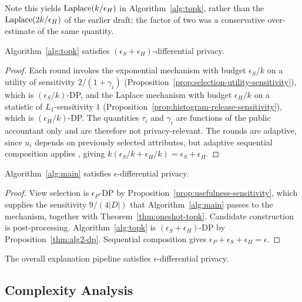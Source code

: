 Note this yields $\operatorname{Laplace}(k/\epsilon_H)$ in Algorithm~\ref{alg:topk}, rather than the $\operatorname{Laplace}(2k/\epsilon_H)$ of the earlier draft; the factor of two was a conservative over-estimate of the same quantity.

\begin{proposition}
\label{thm:alg2-dp}
Algorithm~\ref{alg:topk} satisfies $(\epsilon_S+\epsilon_H)$-differential privacy.
\end{proposition}

\begin{proof}
Each round invokes the exponential mechanism with budget $\epsilon_S/k$ on a utility of sensitivity $2/(1+\gamma_i)$ (Proposition~\ref{prop:selection-utility-sensitivity}), which is $(\epsilon_S/k)$-DP, and the Laplace mechanism with budget $\epsilon_H/k$ on a statistic of $L_1$-sensitivity $1$ (Proposition~\ref{prop:histogram-release-sensitivity}), which is $(\epsilon_H/k)$-DP.
The quantities $\tau_i$ and $\gamma_i$ are functions of the public accountant only and are therefore not privacy-relevant.
The rounds are adaptive, since $u_i$ depends on previously selected attributes, but adaptive sequential composition applies \cite{DBLP:series/synthesis/2016Li}, giving $k(\epsilon_S/k+\epsilon_H/k)=\epsilon_S+\epsilon_H$.
\end{proof}

\begin{proposition}
\label{thm:alg1-dp}
Algorithm~\ref{alg:main} satisfies $\epsilon$-differential privacy.
\end{proposition}

\begin{proof}
View selection is $\epsilon_P$-DP by Proposition~\ref{prop:usefulness-sensitivity}, which supplies the sensitivity $9/(4|D|)$ that Algorithm~\ref{alg:main} passes to the mechanism, together with Theorem~\ref{thm:oneshot-topk}.
Candidate construction is post-processing.
Algorithm~\ref{alg:topk} is $(\epsilon_S+\epsilon_H)$-DP by Proposition~\ref{thm:alg2-dp}.
Sequential composition gives $\epsilon_P+\epsilon_S+\epsilon_H=\epsilon$.
\end{proof}

\begin{corollary}
\label{cor:end-to-end-dp}
The overall explanation pipeline satisfies $\epsilon$-differential privacy.
\end{corollary}

\subsection{Complexity Analysis}
\label{subsec:complexity-analysis}

